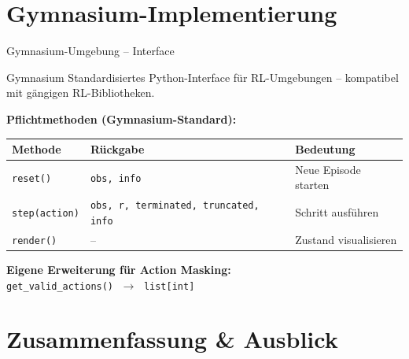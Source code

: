 \documentclass[aspectratio=169]{beamer}
\begin{document}
\section{Gymnasium-Implementierung}

\begin{frame}{Gymnasium-Umgebung -- Interface}

  \begin{block}{Gymnasium}
    Standardisiertes Python-Interface für RL-Umgebungen --
    kompatibel mit gängigen RL-Bibliotheken.
  \end{block}

  \bigskip
  \textbf{Pflichtmethoden (Gymnasium-Standard):}

  \medskip
  \begin{tabular}{lll}
    \hline
    \textbf{Methode} & \textbf{Rückgabe} & \textbf{Bedeutung} \\
    \hline
    \texttt{reset()} & \texttt{obs, info} & Neue Episode starten \\
    \texttt{step(action)} & \texttt{obs, r, terminated, truncated, info} & Schritt ausführen \\
    \texttt{render()} & -- & Zustand visualisieren \\
    \hline
  \end{tabular}

  \medskip
  \textcolor{extramethod}{\textbf{Eigene Erweiterung für Action Masking:}}\\[0.3em]
  \textcolor{extramethod}{\texttt{get\_valid\_actions()} $\;\rightarrow\;$ \texttt{list[int]}}

\end{frame}

\section{Zusammenfassung \& Ausblick}
\end{document}
